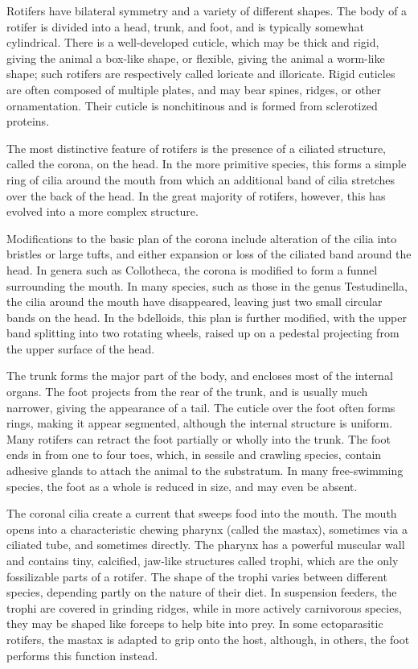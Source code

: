 Rotifers have bilateral symmetry and a variety of different shapes. The body of a rotifer is divided into a head, trunk, and foot, and is typically somewhat cylindrical. There is a well-developed cuticle, which may be thick and rigid, giving the animal a box-like shape, or flexible, giving the animal a worm-like shape; such rotifers are respectively called loricate and illoricate. Rigid cuticles are often composed of multiple plates, and may bear spines, ridges, or other ornamentation. Their cuticle is nonchitinous and is formed from sclerotized proteins.

The most distinctive feature of rotifers is the presence of a ciliated structure, called the corona, on the head. In the more primitive species, this forms a simple ring of cilia around the mouth from which an additional band of cilia stretches over the back of the head. In the great majority of rotifers, however, this has evolved into a more complex structure.

Modifications to the basic plan of the corona include alteration of the cilia into bristles or large tufts, and either expansion or loss of the ciliated band around the head. In genera such as Collotheca, the corona is modified to form a funnel surrounding the mouth. In many species, such as those in the genus Testudinella, the cilia around the mouth have disappeared, leaving just two small circular bands on the head. In the bdelloids, this plan is further modified, with the upper band splitting into two rotating wheels, raised up on a pedestal projecting from the upper surface of the head.

The trunk forms the major part of the body, and encloses most of the internal organs. The foot projects from the rear of the trunk, and is usually much narrower, giving the appearance of a tail. The cuticle over the foot often forms rings, making it appear segmented, although the internal structure is uniform. Many rotifers can retract the foot partially or wholly into the trunk. The foot ends in from one to four toes, which, in sessile and crawling species, contain adhesive glands to attach the animal to the substratum. In many free-swimming species, the foot as a whole is reduced in size, and may even be absent.

The coronal cilia create a current that sweeps food into the mouth. The mouth opens into a characteristic chewing pharynx (called the mastax), sometimes via a ciliated tube, and sometimes directly. The pharynx has a powerful muscular wall and contains tiny, calcified, jaw-like structures called trophi, which are the only fossilizable parts of a rotifer. The shape of the trophi varies between different species, depending partly on the nature of their diet. In suspension feeders, the trophi are covered in grinding ridges, while in more actively carnivorous species, they may be shaped like forceps to help bite into prey. In some ectoparasitic rotifers, the mastax is adapted to grip onto the host, although, in others, the foot performs this function instead.

